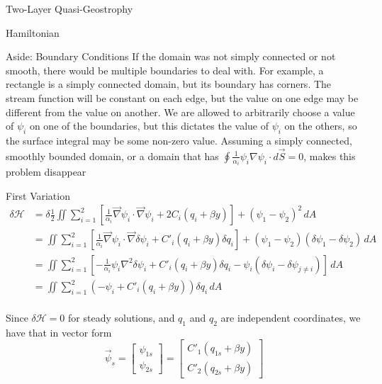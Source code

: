 \documentclass[12pt]{article}
\begin{document}
\begin{section}{Two-Layer Quasi-Geostrophy}
\begin{subsection}{Hamiltonian}
\begin{subsubsection}{Aside: Boundary Conditions}
            If the domain was not simply connected or not smooth, there would be multiple boundaries to deal with. For example, a rectangle is a simply connected domain, but its boundary has corners. The stream function will be constant on each edge, but the value on one edge may be different from the value on another. We are allowed to arbitrarily choose a value of $\psi_i$ on one of the boundaries, but this dictates the value of $\psi_i$ on the others, so the surface integral may be some non-zero value. Assuming a simply connected, smoothly bounded domain, or a domain that has $\oint \frac{1}{\alpha_i}\psi_i \nabla \psi_i\cdot d \vec S = 0$, makes this problem disappear
        \end{subsubsection}
    \end{subsection}

    \begin{subsection}{First Variation}
        \begin{align*}
            \delta \mathcal{H} &= \delta \frac12 \iint \sum_{i=1}^2 \left[ \frac{1}{\alpha_i} \vec\nabla \psi_i \cdot \vec\nabla \psi_i + 2C_i(q_i + \beta y) \right]+ (\psi_1 - \psi_2)^2 \, dA \\
            &= \iint \sum_{i=1}^2 \left[ \frac{1}{\alpha_i} \vec\nabla \psi_i \cdot \vec\nabla \delta\psi_i + C'_i(q_i + \beta y) \delta q_i \right]+ (\psi_1 - \psi_2)(\delta \psi_1 - \delta \psi_2) \, dA \\
            &= \iint \sum_{i=1}^2 \left[ -\frac{1}{\alpha_i} \psi_i \nabla^2 \delta\psi_i + C'_i(q_i + \beta y) \delta q_i - \psi_i(\delta \psi_i - \delta \psi_{j \ne i}) \right] \, dA \\
            &= \iint \sum_{i=1}^2 (-\psi_i + C'_i(q_i + \beta y)) \delta q_i\, dA \\
        \end{align*}

        Since $\delta \mathcal{H} = 0$ for steady solutions, and $q_1$ and $q_2$ are independent coordinates, we have that in vector form
        \begin{equation}
            \vec \psi_s =
            \left[\begin{array}{c}
            \psi_{1s} \\
            \psi_{2s}
            \end{array}\right]
            =
            \left[\begin{array}{c}
            C'_1(q_{1s} + \beta y) \\
            C'_2(q_{2s} + \beta y)
            \end{array}\right]
        \end{equation}
    \end{subsection}


\end{section}
\end{document}
